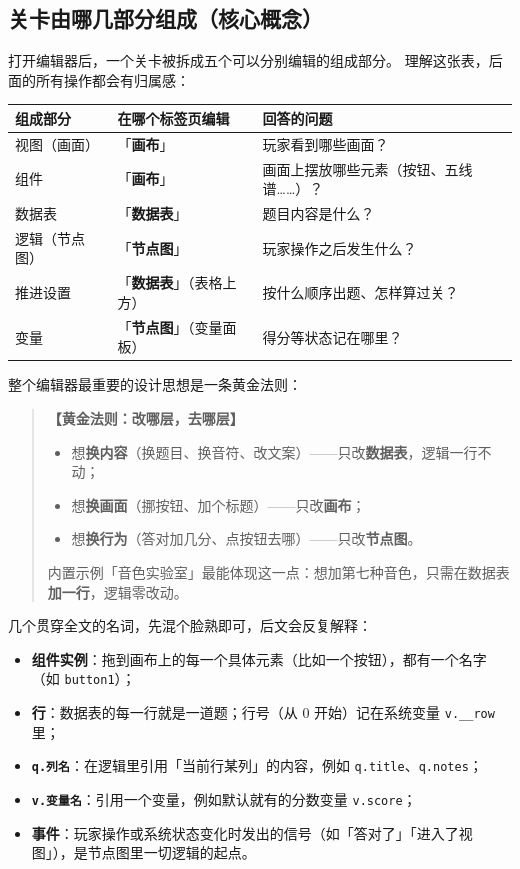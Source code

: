 \documentclass[UTF8,a4paper,zihao=-4]{ctexart}
\newcommand{\code}[1]{\texttt{#1}}   %
\newcommand{\ui}[1]{「\textbf{#1}」}  %
\newenvironment{tip}[1][提示]{%
  \begin{quote}\small\textbf{【#1】}\ignorespaces
}{\end{quote}}
\begin{document}
\subsection{关卡由哪几部分组成（核心概念）}

打开编辑器后，一个关卡被拆成五个可以分别编辑的组成部分。
理解这张表，后面的所有操作都会有归属感：

\begin{center}
\begin{tabular}{lll}
\toprule
组成部分 & 在哪个标签页编辑 & 回答的问题 \\
\midrule
视图（画面） & \ui{画布} & 玩家看到哪些画面？ \\
组件 & \ui{画布} & 画面上摆放哪些元素（按钮、五线谱……）？ \\
数据表 & \ui{数据表} & 题目内容是什么？ \\
逻辑（节点图） & \ui{节点图} & 玩家操作之后发生什么？ \\
推进设置 & \ui{数据表}（表格上方） & 按什么顺序出题、怎样算过关？ \\
变量 & \ui{节点图}（变量面板） & 得分等状态记在哪里？ \\
\bottomrule
\end{tabular}
\end{center}

整个编辑器最重要的设计思想是一条黄金法则：

\begin{tip}[黄金法则：改哪层，去哪层]
\begin{itemize}[nosep]
  \item 想\textbf{换内容}（换题目、换音符、改文案）——只改\textbf{数据表}，逻辑一行不动；
  \item 想\textbf{换画面}（挪按钮、加个标题）——只改\textbf{画布}；
  \item 想\textbf{换行为}（答对加几分、点按钮去哪）——只改\textbf{节点图}。
\end{itemize}
内置示例「音色实验室」最能体现这一点：想加第七种音色，只需在数据表\textbf{加一行}，逻辑零改动。
\end{tip}

几个贯穿全文的名词，先混个脸熟即可，后文会反复解释：

\begin{itemize}[nosep]
  \item \textbf{组件实例}：拖到画布上的每一个具体元素（比如一个按钮），都有一个名字（如 \code{button1}）；
  \item \textbf{行}：数据表的每一行就是一道题；行号（从 0 开始）记在系统变量 \code{v.\_\_row} 里；
  \item \textbf{\code{q.列名}}：在逻辑里引用「当前行某列」的内容，例如 \code{q.title}、\code{q.notes}；
  \item \textbf{\code{v.变量名}}：引用一个变量，例如默认就有的分数变量 \code{v.score}；
  \item \textbf{事件}：玩家操作或系统状态变化时发出的信号（如「答对了」「进入了视图」），是节点图里一切逻辑的起点。
\end{itemize}
\end{document}
